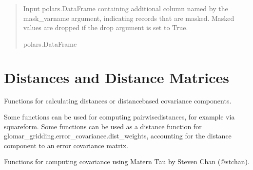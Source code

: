 \documentclass[letterpaper,10pt,english]{sphinxmanual}
\begin{document}
\begin{fulllineitems}
\begin{quote}
\begin{description}
\begin{itemize}
\end{itemize}

\sphinxAtStartPar
{} \textendash{} Input polars.DataFrame containing additional column named by the
mask\_varname argument, indicating records that are masked. Masked values
are dropped if the drop argument is set to True.

\sphinxAtStartPar
polars.DataFrame

\end{description}\end{quote}

\end{fulllineitems}



\section{Distances and Distance Matrices}
\label{\detokenize{misc:module-glomar_gridding.distances}}\label{\detokenize{misc:distances-and-distance-matrices}}
\sphinxAtStartPar
Functions for calculating distances or distance\sphinxhyphen{}based covariance components.

\sphinxAtStartPar
Some functions can be used for computing pairwise\sphinxhyphen{}distances, for example via
squareform. Some functions can be used as a distance function for
glomar\_gridding.error\_covariance.dist\_weights, accounting for the distance
component to an error covariance matrix.

\sphinxAtStartPar
Functions for computing covariance using Matern Tau by Steven Chan (@stchan).
\end{document}
